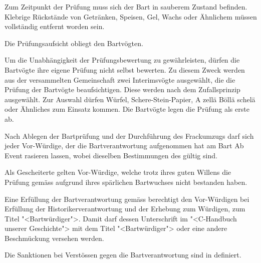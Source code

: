 \documentclass[fontsize=12pt,parskip=half]{scrartcl}
\begin{document}
\begin{contract}
  \SubClause[title={Zustand des Bartes}]
  Zum Zeitpunkt der Prüfung muss sich der Bart in sauberem Zustand befinden. Klebrige Rückstände von Getränken,
  Speisen, Gel, Wachs oder Ähnlichem müssen vollständig entfernt worden sein.

  \SubClause[title={Prüfungsaufsicht}]
  Die Prüfungsaufsicht obliegt den Bartvögten.

  \SubClause[title={Prüfung der Bartvögte}]
  Um die Unabhängigkeit der Prüfungsbewertung zu gewährleisten, dürfen die Bartvögte ihre eigene Prüfung nicht selbst bewerten.
  Zu diesem Zweck werden aus der versammelten Gemeinschaft zwei Interimsvögte ausgewählt, die die Prüfung
  der Bartvögte beaufsichtigen. Diese werden nach dem Zufallsprinzip ausgewählt. Zur Auswahl dürfen Würfel,
  Schere-Stein-Papier, A zellä Böllä schelä oder Ähnliches zum Einsatz kommen. Die Bartvögte legen die
  Prüfung als erste ab.

  \Clause[title={BartAb}]
  Nach Ablegen der Bartprüfung und der Durchführung des Frackumzugs darf sich jeder Vor-Würdige, der die Bartverantwortung aufgenommen
  hat am Bart Ab Event rasieren lassen, wobei dieselben Bestimmungen des  gültig sind.

  \Clause[title={Gescheiterte}]\label{B.gescheiterte}
  Als Gescheiterte gelten Vor-Würdige, welche trotz ihres guten Willens die Prüfung gemäss 
  aufgrund ihres spärlichen Bartwuchses nicht bestanden haben.

  \Clause[title={Titel}]\label{B.barttitel}
  Eine Erfüllung der Bartverantwortung gemäss  berechtigt den Vor-Würdigen bei Erfüllung der Historikerverantwortung 
  und der Erhebung zum Würdigen, zum Titel "<Bartwürdiger">. Damit darf dessen Unterschrift im "<C-Handbuch unserer Geschichte"> mit dem Titel "<Bartwürdiger"> oder eine andere
  Beschmückung versehen werden.

  \Clause[title={Sanktionen}]\label{B.sanktionen}
  Die Sanktionen bei Verstössen gegen die Bartverantwortung sind in  definiert.


\end{contract}

\pagebreak
\end{document}
